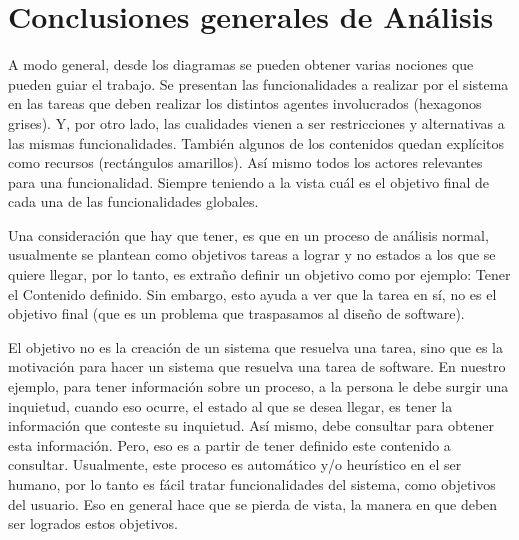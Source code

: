 \section{Conclusiones generales de Análisis}
    \par A modo general, desde los diagramas se pueden obtener varias nociones que pueden guiar el trabajo. Se presentan las funcionalidades a realizar por el sistema en las tareas que deben realizar los distintos agentes involucrados (hexagonos grises). Y, por otro lado, las cualidades vienen a ser restricciones y alternativas a las mismas funcionalidades. También algunos de los contenidos quedan explícitos como recursos (rectángulos amarillos). Así mismo todos los actores relevantes para una funcionalidad. Siempre teniendo a la vista cuál es el objetivo final de cada una de las funcionalidades globales.
    
    \par Una consideración que hay que tener, es que en un proceso de análisis normal, usualmente se plantean como objetivos \guillemotleft tareas \guillemotright a lograr y no estados a los que se quiere llegar, por lo tanto, es extraño definir un objetivo como por ejemplo: Tener el Contenido definido. Sin embargo, esto ayuda a ver que la tarea en sí, no es el objetivo final (que es un problema que traspasamos al diseño de software). 
    \par El objetivo no es la creación de un sistema que resuelva una tarea, sino que es la motivación para hacer un sistema que resuelva una tarea de software. En nuestro ejemplo, para tener información sobre un proceso, a la persona le debe surgir una inquietud, cuando eso ocurre, el estado al que se desea llegar, es tener la información que conteste su inquietud. Así mismo, debe consultar para obtener esta información. Pero, eso es a partir de tener definido este contenido a consultar. Usualmente, este proceso es automático y/o heurístico en el ser humano, por lo tanto es fácil tratar funcionalidades del sistema, como objetivos del usuario. Eso en general hace que se pierda de vista, la manera en que deben ser logrados estos objetivos.
        
